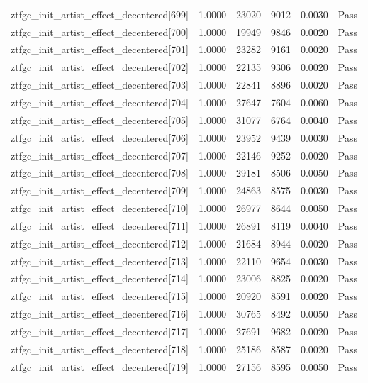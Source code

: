 \begin{table}[htbp]
\begin{tabular}{llrrll}
ztfgc\_init\_artist\_effect\_decentered[699] & 1.0000 & 23020 & 9012 & 0.0030 & Pass \\
ztfgc\_init\_artist\_effect\_decentered[700] & 1.0000 & 19949 & 9846 & 0.0020 & Pass \\
ztfgc\_init\_artist\_effect\_decentered[701] & 1.0000 & 23282 & 9161 & 0.0020 & Pass \\
ztfgc\_init\_artist\_effect\_decentered[702] & 1.0000 & 22135 & 9306 & 0.0020 & Pass \\
ztfgc\_init\_artist\_effect\_decentered[703] & 1.0000 & 22841 & 8896 & 0.0020 & Pass \\
ztfgc\_init\_artist\_effect\_decentered[704] & 1.0000 & 27647 & 7604 & 0.0060 & Pass \\
ztfgc\_init\_artist\_effect\_decentered[705] & 1.0000 & 31077 & 6764 & 0.0040 & Pass \\
ztfgc\_init\_artist\_effect\_decentered[706] & 1.0000 & 23952 & 9439 & 0.0030 & Pass \\
ztfgc\_init\_artist\_effect\_decentered[707] & 1.0000 & 22146 & 9252 & 0.0020 & Pass \\
ztfgc\_init\_artist\_effect\_decentered[708] & 1.0000 & 29181 & 8506 & 0.0050 & Pass \\
ztfgc\_init\_artist\_effect\_decentered[709] & 1.0000 & 24863 & 8575 & 0.0030 & Pass \\
ztfgc\_init\_artist\_effect\_decentered[710] & 1.0000 & 26977 & 8644 & 0.0050 & Pass \\
ztfgc\_init\_artist\_effect\_decentered[711] & 1.0000 & 26891 & 8119 & 0.0040 & Pass \\
ztfgc\_init\_artist\_effect\_decentered[712] & 1.0000 & 21684 & 8944 & 0.0020 & Pass \\
ztfgc\_init\_artist\_effect\_decentered[713] & 1.0000 & 22110 & 9654 & 0.0030 & Pass \\
ztfgc\_init\_artist\_effect\_decentered[714] & 1.0000 & 23006 & 8825 & 0.0020 & Pass \\
ztfgc\_init\_artist\_effect\_decentered[715] & 1.0000 & 20920 & 8591 & 0.0020 & Pass \\
ztfgc\_init\_artist\_effect\_decentered[716] & 1.0000 & 30765 & 8492 & 0.0050 & Pass \\
ztfgc\_init\_artist\_effect\_decentered[717] & 1.0000 & 27691 & 9682 & 0.0020 & Pass \\
ztfgc\_init\_artist\_effect\_decentered[718] & 1.0000 & 25186 & 8587 & 0.0020 & Pass \\
ztfgc\_init\_artist\_effect\_decentered[719] & 1.0000 & 27156 & 8595 & 0.0050 & Pass \\

\end{tabular}
\end{table}
